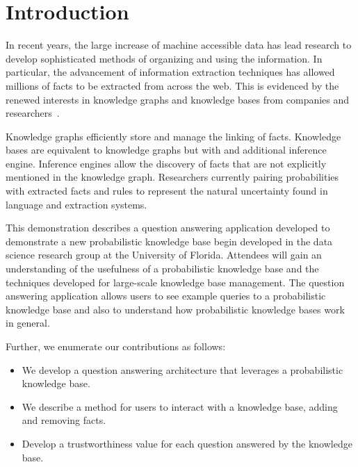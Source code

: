

\section{Introduction}


In recent years, the large increase of machine accessible data has lead research
to develop sophisticated methods of organizing and using the information.
In particular, the advancement of information extraction techniques has allowed
millions of facts to be extracted from across the web.
This is evidenced by the renewed interests in knowledge graphs and knowledge bases
from companies and
researchers~\cite{bellare2013woo,chang2014typed,dong2014knowledge,niu2012deepdive}.

Knowledge graphs efficiently store and manage the linking of facts.
Knowledge bases are equivalent to knowledge graphs but with and additional
inference engine. 
Inference engines allow the discovery of facts that are not explicitly
mentioned in the knowledge graph.
Researchers currently pairing probabilities with extracted facts and rules to
represent the natural uncertainty found in language and extraction systems.

This demonstration describes a question answering application developed to demonstrate
a new probabilistic knowledge base begin developed in the data science research group at the University of Florida.
Attendees will gain an understanding of the usefulness of a probabilistic
knowledge base and the techniques developed for large-scale knowledge base
management.
The question answering application allows users to see example queries to a
probabilistic knowledge base and also to understand how probabilistic knowledge bases work in general.

Further, we enumerate our contributions as follows:
\begin{itemize}
\item We develop a question answering architecture that leverages a probabilistic knowledge base.
\item We describe a method for users to interact with a knowledge base, adding and removing facts.
\item Develop a trustworthiness value for each question answered by the knowledge base.
\end{itemize}



